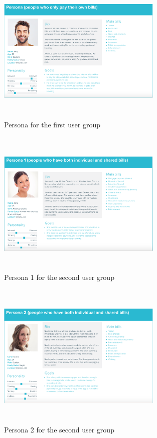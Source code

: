 \documentclass{sigchi}
\begin{document}
\begin{figure}[h]
\centering
  \includegraphics[width=0.7\textwidth,height=7cm]{persona1.png}
  \caption{Persona for the first user group}
  \label{fig:figure2}
\end{figure}
\begin{figure}[h]
\centering
  \includegraphics[width=0.7\textwidth,height=7cm]{persona1-1.png}
  \caption{Persona 1 for the second user group}
  \label{fig:figure3}
\end{figure}
\begin{figure}[h!]
\centering
  \includegraphics[width=0.7\textwidth,height=7cm]{persona1-2.png}
  \caption{Persona 2 for the second user group}
  \label{fig:figure4}
\end{figure}
\end{document}
